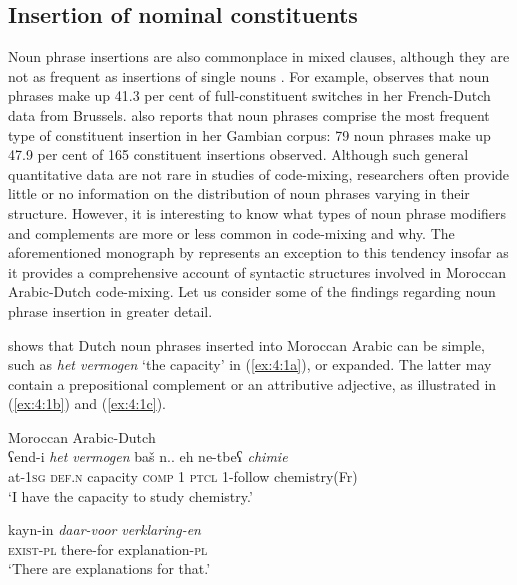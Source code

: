 \subsection{Insertion of nominal constituents}{\label{nominal-constituents}}
Noun phrase insertions are also commonplace in mixed clauses, although they are not as frequent as insertions of single nouns \citep[cf.][]{poplack-sometimes-1980}. For example, \citet[205]{treffers-daller-mixing-1994} observes that noun phrases make up 41.3 per cent of full-constituent switches in her French-Dutch data from Brussels. \citet[165]{haust-codeswitching-1995} also reports that noun phrases comprise the most frequent type of constituent insertion in her Gambian corpus: 79 noun phrases make up 47.9 per cent of 165 constituent insertions observed. Although such general quantitative data are not rare in studies of code-mixing, researchers often provide little or no information on the distribution of noun phrases varying in their structure. However, it is interesting to know what types of noun phrase modifiers and complements are more or less common in code-mixing and why. The aforementioned monograph by \citet{boumans-syntax-1998} represents an exception to this tendency insofar as it provides a comprehensive account of syntactic structures involved in Moroccan Arabic-Dutch code-mixing. Let us consider some of the findings regarding noun phrase insertion in greater detail. 

\citet{boumans-syntax-1998} shows that Dutch noun phrases inserted into Moroccan Arabic can be simple, such as \textit{het vermogen} `the capacity' in ({\ref{ex:4:1a}}), or expanded. The latter may contain a prepositional complement or an attributive adjective, as illustrated in (\ref{ex:4:1b}) and (\ref{ex:4:1c}).

\ea
Moroccan Arabic-Dutch \citep[212, 199, 212]{boumans-syntax-1998}\\

\ea{\label{ex:4:1a}}
\gll ʕend-i \textit{het} \textit{vermogen} baš n.. eh ne-tbeʕ \textit{chimie}\\
    at-\textsc{1sg} \textsc{def.n} capacity \textsc{comp} 1 \textsc{ptcl} 1-follow chemistry(Fr)\\
\glt `I have the capacity to study chemistry.'

\ex{\label{ex:4:1b}}
\gll kayn-in \textit{daar-voor} \textit{verklaring-en}\\
	\textsc{exist-pl} there-for explanation-\textsc{pl}\\
\glt `There are explanations for that.' 

